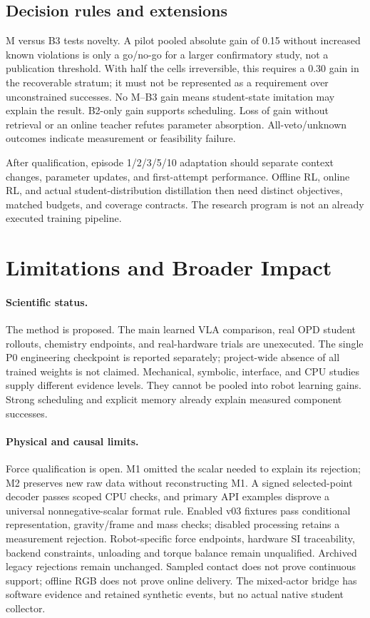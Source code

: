 \documentclass{article}
\begin{document}
\subsection{Decision rules and extensions}
M versus B3 tests novelty. A pilot pooled absolute gain of 0.15 without increased known violations is only a go/no-go for a larger confirmatory study, not a publication threshold. With half the cells irreversible, this requires a 0.30 gain in the recoverable stratum; it must not be represented as a requirement over unconstrained successes. No M--B3 gain means student-state imitation may explain the result. B2-only gain supports scheduling. Loss of gain without retrieval or an online teacher refutes parameter absorption. All-veto/unknown outcomes indicate measurement or feasibility failure.

After qualification, episode 1/2/3/5/10 adaptation should separate context changes, parameter updates, and first-attempt performance. Offline RL, online RL, and actual student-distribution distillation then need distinct objectives, matched budgets, and coverage contracts. The research program is not an already executed training pipeline.

\section{Limitations and Broader Impact}
\paragraph{Scientific status.}
The method is proposed. The main learned VLA comparison, real OPD student rollouts, chemistry endpoints, and real-hardware trials are unexecuted. The single P0 engineering checkpoint is reported separately; project-wide absence of all trained weights is not claimed. Mechanical, symbolic, interface, and CPU studies supply different evidence levels. They cannot be pooled into robot learning gains. Strong scheduling and explicit memory already explain measured component successes.

\paragraph{Physical and causal limits.}
Force qualification is open. M1 omitted the scalar needed to explain its rejection; M2 preserves new raw data without reconstructing M1. A signed selected-point decoder passes scoped CPU checks, and primary API examples disprove a universal nonnegative-scalar format rule. Enabled v03 fixtures pass conditional representation, gravity/frame and mass checks; disabled processing retains a measurement rejection. Robot-specific force endpoints, hardware SI traceability, backend constraints, unloading and torque balance remain unqualified. Archived legacy rejections remain unchanged. Sampled contact does not prove continuous support; offline RGB does not prove online delivery. The mixed-actor bridge has software evidence and retained synthetic events, but no actual native student collector.
\end{document}

